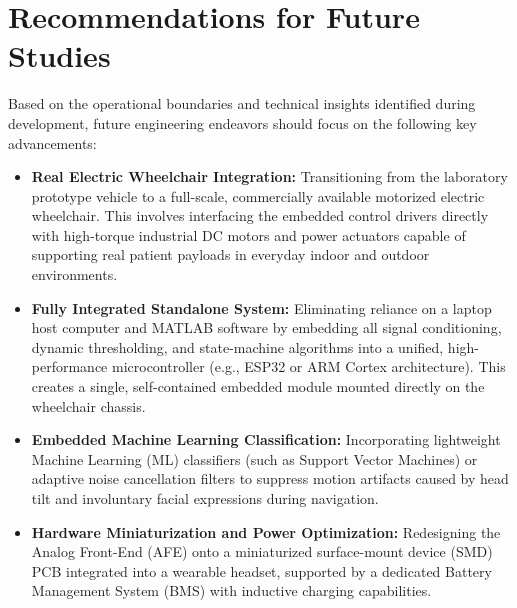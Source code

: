 \section{Recommendations for Future Studies}
\label{sec:future_recommendations}

Based on the operational boundaries and technical insights identified during development, future engineering endeavors should focus on the following key advancements:

\begin{itemize}
    \item \textbf{Real Electric Wheelchair Integration:} Transitioning from the laboratory prototype vehicle to a full-scale, commercially available motorized electric wheelchair. This involves interfacing the embedded control drivers directly with high-torque industrial DC motors and power actuators capable of supporting real patient payloads in everyday indoor and outdoor environments.

    \item \textbf{Fully Integrated Standalone System:} Eliminating reliance on a laptop host computer and MATLAB software by embedding all signal conditioning, dynamic thresholding, and state-machine algorithms into a unified, high-performance microcontroller (e.g., ESP32 or ARM Cortex architecture). This creates a single, self-contained embedded module mounted directly on the wheelchair chassis.

    \item \textbf{Embedded Machine Learning Classification:} Incorporating lightweight Machine Learning (ML) classifiers (such as Support Vector Machines) or adaptive noise cancellation filters to suppress motion artifacts caused by head tilt and involuntary facial expressions during navigation.

    \item \textbf{Hardware Miniaturization and Power Optimization:} Redesigning the Analog Front-End (AFE) onto a miniaturized surface-mount device (SMD) PCB integrated into a wearable headset, supported by a dedicated Battery Management System (BMS) with inductive charging capabilities.
\end{itemize}
